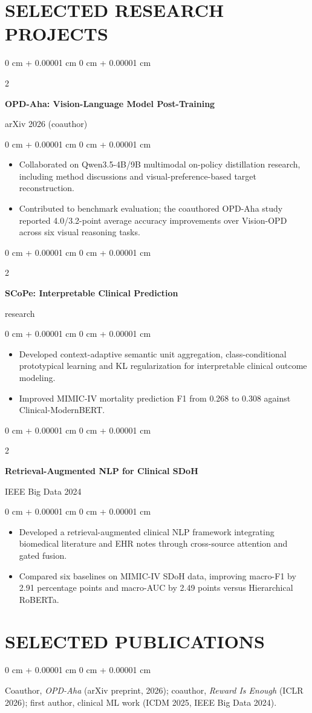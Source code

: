 \documentclass[10pt, letterpaper]{article}
\newenvironment{highlights}{
    \begin{itemize}[
        topsep=0.03 cm,
        parsep=0.03 cm,
        partopsep=0pt,
        itemsep=0pt,
        leftmargin=0 cm + 10pt
    ]
}{
    \end{itemize}
} %
\newenvironment{onecolentry}{
    \begin{adjustwidth}{
        0 cm + 0.00001 cm
    }{
        0 cm + 0.00001 cm
    }
}{
    \end{adjustwidth}
} %
\newenvironment{twocolentry}[2][]{
    \onecolentry
    \def\secondColumn{#2}
    \setcolumnwidth{\fill, 4.5 cm}
    \begin{paracol}{2}
}{
    \switchcolumn \raggedleft \secondColumn
    \end{paracol}
    \endonecolentry
} %
\begin{document}
\section{SELECTED RESEARCH PROJECTS}
\begin{twocolentry}{arXiv 2026 (coauthor)}
\textbf{OPD-Aha: Vision-Language Model Post-Training}
\end{twocolentry}
\begin{onecolentry}
\begin{highlights}
\item Collaborated on Qwen3.5-4B/9B multimodal on-policy distillation research, including method discussions and visual-preference-based target reconstruction.
\item Contributed to benchmark evaluation; the coauthored OPD-Aha study reported 4.0/3.2-point average accuracy improvements over Vision-OPD across six visual reasoning tasks.
\end{highlights}
\end{onecolentry}
\vspace{0.03 cm}
\begin{twocolentry}{2026 research}
\textbf{SCoPe: Interpretable Clinical Prediction}
\end{twocolentry}
\begin{onecolentry}
\begin{highlights}
\item Developed context-adaptive semantic unit aggregation, class-conditional prototypical learning and KL regularization for interpretable clinical outcome modeling.
\item Improved MIMIC-IV mortality prediction F1 from 0.268 to 0.308 against Clinical-ModernBERT.
\end{highlights}
\end{onecolentry}
\vspace{0.03 cm}
\begin{twocolentry}{IEEE Big Data 2024}
\textbf{Retrieval-Augmented NLP for Clinical SDoH}
\end{twocolentry}
\begin{onecolentry}
\begin{highlights}
\item Developed a retrieval-augmented clinical NLP framework integrating biomedical literature and EHR notes through cross-source attention and gated fusion.
\item Compared six baselines on MIMIC-IV SDoH data, improving macro-F1 by 2.91 percentage points and macro-AUC by 2.49 points versus Hierarchical RoBERTa.
\end{highlights}
\end{onecolentry}
\vspace{0.03 cm}
\section{SELECTED PUBLICATIONS}
\begin{onecolentry}
Coauthor, \textit{OPD-Aha} (arXiv preprint, 2026); coauthor, \textit{Reward Is Enough} (ICLR 2026); first author, clinical ML work (ICDM 2025, IEEE Big Data 2024).
\end{onecolentry}
\end{document}
